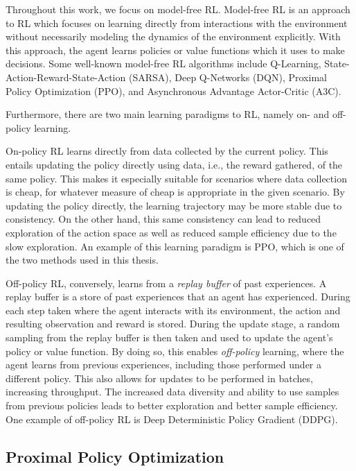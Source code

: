 Throughout this work, we focus on model-free RL.
Model-free RL is an approach to RL which focuses on learning directly from interactions with the environment without necessarily modeling the dynamics of the environment explicitly.
With this approach, the agent learns policies or value functions which it uses to make decisions.
Some well-known model-free RL algorithms include Q-Learning, State-Action-Reward-State-Action (SARSA), Deep Q-Networks (DQN), Proximal Policy Optimization (PPO), and Asynchronous Advantage Actor-Critic (A3C).

Furthermore, there are two main learning paradigms to RL, namely on- and off-policy learning.

On-policy RL learns directly from data collected by the current policy.
This entails updating the policy directly using data, i.e., the reward gathered, of the same policy.
This makes it especially suitable for scenarios where data collection is cheap, for whatever measure of cheap is appropriate in the given scenario.
By updating the policy directly, the learning trajectory may be more stable due to consistency.
On the other hand, this same consistency can lead to reduced exploration of the action space as well as reduced sample efficiency due to the slow exploration.
An example of this learning paradigm is PPO, which is one of the two methods used in this thesis.

Off-policy RL, conversely, learns from a \textit{replay buffer} of past experiences.
A replay buffer is a store of past experiences that an agent has experienced.
During each step taken where the agent interacts with its environment, the action and resulting observation and reward is stored.
During the update stage, a random sampling from the replay buffer is then taken and used to update the agent's policy or value function.
By doing so, this enables \textit{off-policy} learning, where the agent learns from previous experiences, including those performed under a different policy.
This also allows for updates to be performed in batches, increasing throughput.
The increased data diversity and ability to use samples from previous policies leads to better exploration and better sample efficiency.
One example of off-policy RL is Deep Deterministic Policy Gradient (DDPG).

\subsection{Proximal Policy Optimization}\label{subsec:background-ppo}

